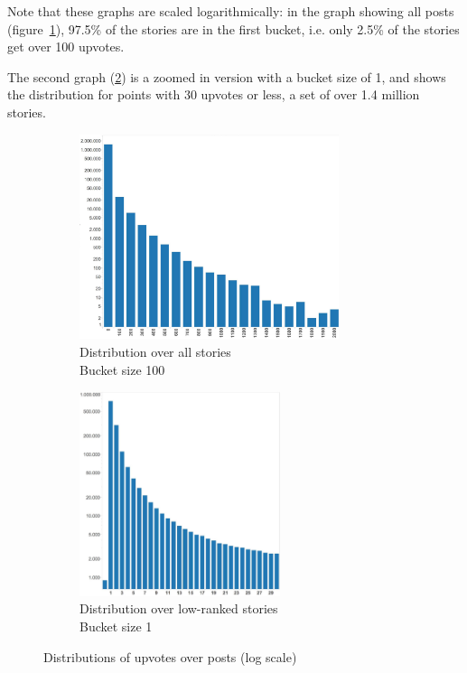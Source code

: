 Note that these graphs are scaled logarithmically: in the graph showing all posts (figure~\ref{fig:distribution_all}), 97.5\% of the stories are in the first bucket, i.e. only 2.5\% of the stories get over 100 upvotes. 

The second graph (\ref{fig:distribution_zoomed_in}) is a zoomed in version with a bucket size of 1, and shows the distribution for points with 30 upvotes or less, a set of over 1.4 million stories.

\begin{figure}[ht!]
\centering
\begin{subfigure}{.55\textwidth}
  \centering
  \includegraphics[height=6cm]{upvote_distribution_all}
  \caption{Distribution over all stories\\Bucket size 100}
  \label{fig:distribution_all}
\end{subfigure}%
\begin{subfigure}{.45\textwidth}
  \centering
  \includegraphics[height=6cm]{upvote_distribution_zoomed_in}
  \caption{Distribution over low-ranked stories\\Bucket size 1}
  \label{fig:distribution_zoomed_in}
\end{subfigure}
\caption{Distributions of upvotes over posts (log scale)}
\label{fig:distribution}
\end{figure}

